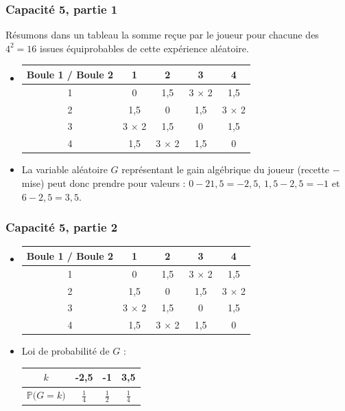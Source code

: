 \documentclass[11pt, hyperref={urlcolor=red,%
            linkcolor=blue, %
            colorlinks=true}]{beamer}
\newcommand{\proba}[1]{\mathbb{P}\big(#1\big)}
\begin{document}
\begin{frame}

\frametitle{Capacité 5,  partie 1}

Résumons dans un tableau la somme reçue par le joueur pour chacune des $4^2=16$ issues équiprobables de cette expérience aléatoire.

\begin{itemize}

\pause \item 
\begin{tabular}{|c|c|c|c|c|}
\hline 
Boule 1 / Boule 2 & 1 & 2 & 3 & 4 \\ 
\hline 
1 & 0 &  1,5 & 3 $\times$ 2 & 1,5 \\ 
\hline 
2 & 1,5 & 0 &  1,5 & 3 $\times$ 2    \\ 
\hline 
3 & 3 $\times$ 2 &1,5 & 0 & 1,5 \\ 
\hline 
4 & 1,5 & 3 $\times$ 2 & 1,5 & 0 \\ 
\hline 
\end{tabular} 
	\pause \item La variable aléatoire $G$ représentant le gain algébrique du joueur (recette $-$ mise) peut donc prendre pour valeurs : $0-21,5=-2,5$, $1,5-2,5=-1$ et $6-2,5=3,5$.
	\end{itemize}
	
\end{frame}

\begin{frame}

\frametitle{Capacité 5,  partie 2}

\begin{itemize}

 \item 
\begin{tabular}{|c|c|c|c|c|}
\hline 
Boule 1 / Boule 2 & 1 & 2 & 3 & 4 \\ 
\hline 
1 & 0 &  1,5 & 3 $\times$ 2 & 1,5 \\ 
\hline 
2 & 1,5 & 0 &  1,5 & 3 $\times$ 2    \\ 
\hline 
3 & 3 $\times$ 2 &1,5 & 0 & 1,5 \\ 
\hline 
4 & 1,5 & 3 $\times$ 2 & 1,5 & 0 \\ 
\hline 
\end{tabular} 
	
	\pause \item  Loi de probabilité de $G$ :
	
\begin{tabular}{|c|c|c|c|}
\hline 
$k$ & -2,5 & -1 & 3,5 \\ 
\hline 
$\proba{G=k}$ & $\frac{1}{4}$ & $\frac{1}{2}$ & $\frac{1}{4}$ \\ 
\hline 
\end{tabular} 
	\end{itemize}
	
\end{frame}
\end{document}
